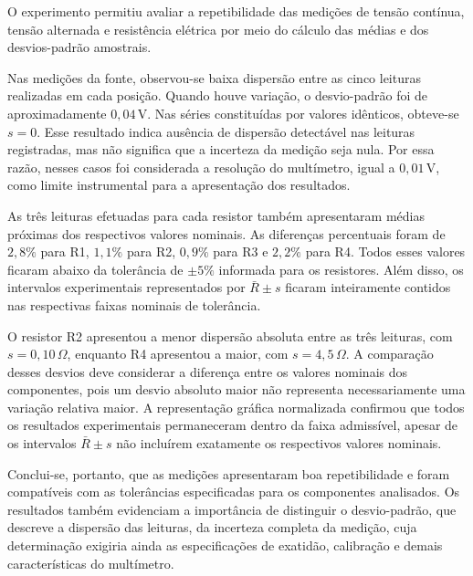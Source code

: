 \documentclass[a4paper,12pt]{article}
\begin{document}
O experimento permitiu avaliar a repetibilidade das medições de tensão
contínua, tensão alternada e resistência elétrica por meio do cálculo
das médias e dos desvios-padrão amostrais.

Nas medições da fonte, observou-se baixa dispersão entre as cinco
leituras realizadas em cada posição. Quando houve variação, o
desvio-padrão foi de aproximadamente \(0{,}04\,\mathrm{V}\). Nas séries
constituídas por valores idênticos, obteve-se \(s=0\). Esse resultado
indica ausência de dispersão detectável nas leituras registradas, mas
não significa que a incerteza da medição seja nula. Por essa razão,
nesses casos foi considerada a resolução do multímetro, igual a
\(0{,}01\,\mathrm{V}\), como limite instrumental para a apresentação
dos resultados.

As três leituras efetuadas para cada resistor também apresentaram
médias próximas dos respectivos valores nominais. As diferenças
percentuais foram de \(2{,}8\%\) para R1, \(1{,}1\%\) para R2,
\(0{,}9\%\) para R3 e \(2{,}2\%\) para R4. Todos esses valores ficaram
abaixo da tolerância de \(\pm 5\%\) informada para os resistores. Além
disso, os intervalos experimentais representados por
\(\bar{R}\pm s\) ficaram inteiramente contidos nas respectivas faixas
nominais de tolerância.

O resistor R2 apresentou a menor dispersão absoluta entre as três
leituras, com \(s=0{,}10\,\Omega\), enquanto R4 apresentou a maior,
com \(s=4{,}5\,\Omega\). A comparação desses desvios deve considerar
a diferença entre os valores nominais dos componentes, pois um desvio
absoluto maior não representa necessariamente uma variação relativa
maior. A representação gráfica normalizada confirmou que todos os
resultados experimentais permaneceram dentro da faixa admissível,
apesar de os intervalos \(\bar{R}\pm s\) não incluírem exatamente os
respectivos valores nominais.

Conclui-se, portanto, que as medições apresentaram boa repetibilidade
e foram compatíveis com as tolerâncias especificadas para os
componentes analisados. Os resultados também evidenciam a importância
de distinguir o desvio-padrão, que descreve a dispersão das leituras,
da incerteza completa da medição, cuja determinação exigiria ainda as
especificações de exatidão, calibração e demais características do
multímetro.

\newpage
\end{document}

